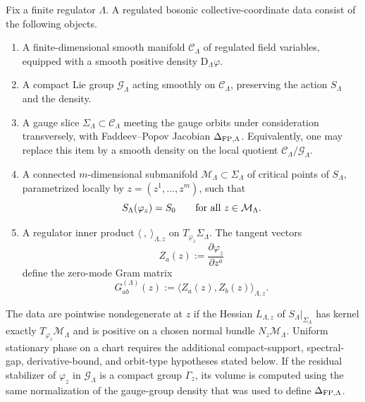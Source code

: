 \begin{definition}
\label{def:regulated-collective-coordinate-data}
Fix a finite regulator \(\Lambda\).  A regulated bosonic
collective-coordinate data consist of the following objects.

\begin{enumerate}
\item A finite-dimensional smooth manifold \(\mathcal C_\Lambda\) of
regulated field variables, equipped with a smooth positive density
\(\mathrm D_\Lambda\varphi\).
\item A compact Lie group \(\mathcal G_\Lambda\) acting smoothly on
\(\mathcal C_\Lambda\), preserving the action \(S_\Lambda\) and the density.
\item A gauge slice \(\Sigma_\Lambda\subset\mathcal C_\Lambda\) meeting the
gauge orbits under consideration transversely, with Faddeev--Popov
Jacobian \(\Delta_{\rm FP,\Lambda}\).  Equivalently, one may replace this
item by a smooth density on the local quotient
\(\mathcal C_\Lambda/\mathcal G_\Lambda\).
\item A connected \(m\)-dimensional submanifold
\(\mathcal M_\Lambda\subset\Sigma_\Lambda\) of critical points of
\(S_\Lambda\), parametrized locally by \(z=(z^1,\ldots,z^m)\), such that
\[
  S_\Lambda(\varphi_z)=S_0
  \qquad
  \hbox{for all }z\in\mathcal M_\Lambda .
\]
\item A regulator inner product
\(\langle\ ,\ \rangle_{\Lambda,z}\) on \(T_{\varphi_z}\Sigma_\Lambda\).
The tangent vectors
\[
  Z_a(z):=\frac{\partial\varphi_z}{\partial z^a}
\]
define the zero-mode Gram matrix
\begin{equation}
  G_{ab}^{(\Lambda)}(z)
  :=
  \langle Z_a(z),Z_b(z)\rangle_{\Lambda,z}.
  \label{eq:collective-coordinate-zero-mode-gram}
\end{equation}
\end{enumerate}
The data are pointwise nondegenerate at \(z\) if the Hessian \(L_{\Lambda,z}\)
of \(S_\Lambda|_{\Sigma_\Lambda}\) has kernel exactly
\(T_{\varphi_z}\mathcal M_\Lambda\) and is positive on a chosen normal bundle
\(N_z\mathcal M_\Lambda\).  Uniform stationary phase on a chart requires the
additional compact-support, spectral-gap, derivative-bound, and orbit-type
hypotheses stated below.  If the residual stabilizer of \(\varphi_z\) in
\(\mathcal G_\Lambda\) is a compact group \(\Gamma_z\), its volume is computed
using the same normalization of the gauge-group density that was used to
define \(\Delta_{\rm FP,\Lambda}\).
\end{definition}

